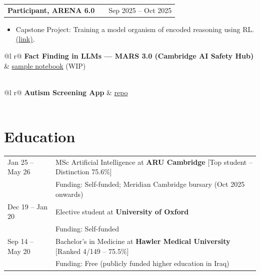 \documentclass[a4paper,12pt]{article}
\makeatletter
\newenvironment{joblong}[2]
    {
    \begin{tabularx}{\linewidth}{@{}l X r@{}}
    \textbf{#1} & \hfill &  #2 \\[3.75pt]
    \end{tabularx}
    \begin{minipage}[t]{\linewidth}
    \begin{itemize}[nosep,after=\strut, leftmargin=1em, itemsep=3pt,label=--]
    }
    {
    \end{itemize}
    \end{minipage}    
    }
\makeatother
\begin{document}
\begin{joblong}{Participant, ARENA 6.0}{Sep 2025 -- Oct 2025}

\item Capstone Project: Training a model organism of encoded reasoning using RL. \href{https://www.lesswrong.com/posts/uznhavfcivA8vojMS/an-arena-6-0-capstone-model-organism-of-encoded-reasoning}{(link)}.

\end{joblong}


\begin{tabularx}{\linewidth}{ @{}l r@{} }
\textbf{Fact Finding in LLMs — MARS 3.0 (Cambridge AI Safety Hub)} & \hfill \href{https://stefanhex.com/mars-transformer-knowledge/ablations_main.html}{sample notebook} (WIP) \\[3.75pt]
  \\
\end{tabularx}

\vspace{6pt}

\begin{tabularx}{\linewidth}{ @{}l r@{} }
\textbf{Autism Screening App} & \hfill \href{https://github.com/mshahoyi/asd_screener}{repo} \\[3.75pt]
  \\
\end{tabularx}

  
\section{Education}
\begin{tabularx}{\linewidth}{@{}l X@{}} 

Jan 25 -- May 26 & MSc Artificial Intelligence at \textbf{ARU Cambridge} \hfill [Top student -- Distinction 75.6\%] \\
& Funding: Self-funded; Meridian Cambridge bursary (Oct 2025 onwards) \\

Dec 19 -- Jan 20 & Elective student at \textbf{University of Oxford} \\
& Funding: Self-funded \\

Sep 14 -- May 20 & Bachelor's in Medicine at \textbf{Hawler Medical University} \hfill [Ranked 4/149 -- 75.5\%] \\
& Funding: Free (publicly funded higher education in Iraq) \\

\end{tabularx}
\end{document}
